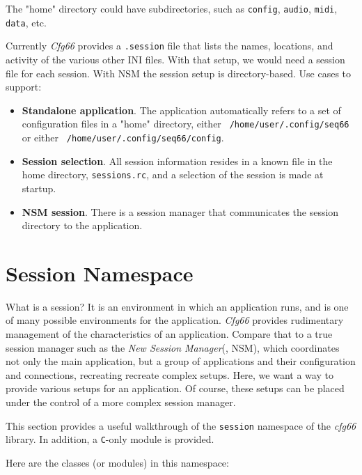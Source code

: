    The "home" directory could have subdirectories, such as
   \texttt{config}, \texttt{audio}, \texttt{midi}, \texttt{data}, etc.

   Currently \textsl{Cfg66} provides a \texttt{.session} file that lists
   the names, locations, and activity of the various other INI files.
   With that setup, we would need a session file for each session.
   With NSM the session setup is directory-based.
   Use cases to support:

   \begin{itemize}
      \item \textbf{Standalone application}.
         The application automatically refers to a set of configuration files
         in a "home" directory,
         either \texttt{~/home/user/.config/seq66} or
         either \texttt{~/home/user/.config/seq66/config}.
      \item \textbf{Session selection}.
         All session information resides in a known file in the home
         directory, \texttt{sessions.rc}, and a selection of the session
         is made at startup.
      \item \textbf{NSM session}.
         There is a session manager that communicates the session directory
         to the application.
   \end{itemize}

\section{Session Namespace}
\label{sec:session_namespace}

   What is a session?
   It is an environment in which an application runs, and is one of many
   possible environments for the application.
   \textsl{Cfg66} provides rudimentary management of the characteristics of
   an application. Compare that to a true session manager such as the
   \textsl{New Session Manager}(\cite{nsm}, NSM), which coordinates not only
   the main application, but a group of applications and their configuration
   and connections, recreating recreate complex setups.
   Here, we want a way to provide various setups for an application.
   Of course, these setups can be placed under the control of a more complex
   session manager.

   This section provides a useful walkthrough of the \texttt{session} namespace of
   the \textsl{cfg66} library.
   In addition, a \texttt{C}-only module is provided.

   Here are the classes (or modules) in this namespace:


